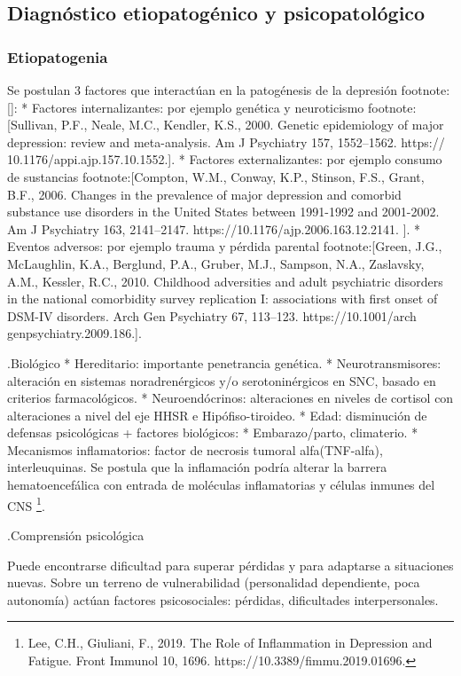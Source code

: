 \documentclass{scrbook}
\begin{document}
\subsection*{Diagnóstico etiopatogénico y psicopatológico}
\subsubsection*{Etiopatogenia}
Se postulan 3 factores que interactúan en la patogénesis de la depresión footnote:[]:
* Factores internalizantes: por ejemplo genética y neuroticismo footnote:[Sullivan, P.F., Neale, M.C., Kendler, K.S., 2000. Genetic epidemiology of major
depression: review and meta-analysis. Am J Psychiatry 157, 1552–1562. https://
10.1176/appi.ajp.157.10.1552.].
* Factores externalizantes: por ejemplo consumo de sustancias footnote:[Compton, W.M., Conway, K.P., Stinson, F.S., Grant, B.F., 2006. Changes in the
prevalence of major depression and comorbid substance use disorders in the United
States between 1991-1992 and 2001-2002. Am J Psychiatry 163, 2141–2147.
https://10.1176/ajp.2006.163.12.2141. ].
* Eventos adversos: por ejemplo trauma y pérdida parental footnote:[Green, J.G., McLaughlin, K.A., Berglund, P.A., Gruber, M.J., Sampson, N.A.,
Zaslavsky, A.M., Kessler, R.C., 2010. Childhood adversities and adult psychiatric
disorders in the national comorbidity survey replication I: associations with first
onset of DSM-IV disorders. Arch Gen Psychiatry 67, 113–123. https://10.1001/arch
genpsychiatry.2009.186.].

.Biológico
* Hereditario: importante penetrancia genética.
* Neurotransmisores: alteración en sistemas noradrenérgicos y/o serotoninérgicos en SNC, basado en criterios farmacológicos.
* Neuroendócrinos: alteraciones en niveles de cortisol con alteraciones a nivel del eje HHSR e Hipófiso-tiroideo.
* Edad: disminución de defensas psicológicas + factores biológicos:
* Embarazo/parto, climaterio.
* Mecanismos inflamatorios: factor de necrosis tumoral alfa(TNF-alfa), interleuquinas. Se postula que la inflamación podría alterar la barrera hematoencefálica con entrada de moléculas inflamatorias y células inmunes del CNS \footnote{Lee, C.H., Giuliani, F., 2019. The Role of Inflammation in Depression and Fatigue. Front
Immunol 10, 1696. https://10.3389/fimmu.2019.01696.}.

.Comprensión psicológica

Puede encontrarse dificultad para superar pérdidas y para adaptarse a situaciones nuevas. Sobre un terreno de vulnerabilidad (personalidad dependiente, poca autonomía) actúan factores psicosociales: pérdidas, dificultades interpersonales.
\end{document}
